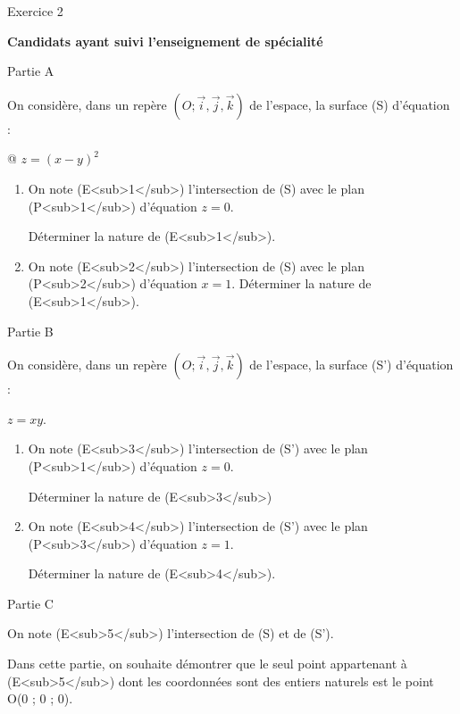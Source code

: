 
%
\begin{h2}Exercice 2\end{h2}
\textbf{Candidats ayant suivi l'enseignement de spécialité}
\begin{h3}Partie A\end{h3}
On considère, dans un repère $\left(O ; \vec{i},\vec{j},\vec{k}\right)$ de l'espace, la surface (S) d'équation :

\begin{center}

\end{center}@
$z=\left(x-y\right)^{2}$
\begin{enumerate}
     \item
     On note (E<sub>1</sub>) l'intersection de (S) avec le plan (P<sub>1</sub>) d'équation $z=0$.
     \par
     Déterminer la nature de (E<sub>1</sub>).
     \item
     On note (E<sub>2</sub>) l'intersection de (S) avec le plan (P<sub>2</sub>) d'équation $x=1$. Déterminer la nature de (E<sub>1</sub>).
\end{enumerate}
\begin{h3}Partie B\end{h3}
On considère, dans un repère $\left(O ; \vec{i},\vec{j},\vec{k}\right)$ de l'espace, la surface (S') d'équation :
\par
$z=xy$.
\begin{enumerate}
     \item
     On note (E<sub>3</sub>) l'intersection de (S') avec le plan (P<sub>1</sub>) d'équation $z=0$.
     \par
     Déterminer la nature de (E<sub>3</sub>)
     \item
     On note (E<sub>4</sub>) l'intersection de (S') avec le plan (P<sub>3</sub>) d'équation $z=1$.
     \par
     Déterminer la nature de (E<sub>4</sub>).
\end{enumerate}
\begin{h3}Partie C\end{h3}
On note (E<sub>5</sub>) l'intersection de (S) et de (S').
\par
Dans cette partie, on souhaite démontrer que le seul point appartenant à (E<sub>5</sub>) dont les coordonnées sont des entiers naturels est le point O(0 ; 0 ; 0).
\par
